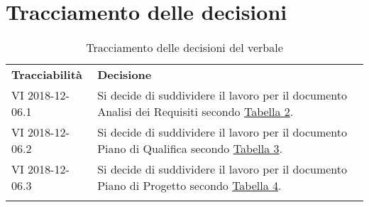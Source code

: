 \clearpage
\section{Tracciamento delle decisioni}
\begin{center}
	\renewcommand{\arraystretch}{1.5}
	\begin{longtable}{  p{2.8cm} p{11.4cm} }
		\rowcolor{tableHeadYellow}
		\textbf{Tracciabilità}&\textbf{Decisione}\\
		VI 2018-12-06.1 & Si decide di suddividere il lavoro per il documento Analisi dei Requisiti secondo \hyperref[sec:tabella_riassuntiva1]{Tabella 2}.\\
		VI 2018-12-06.2 & Si decide di suddividere il lavoro per il documento Piano di Qualifica secondo \hyperref[sec:tabella_riassuntiva2]{Tabella 3}.\\
		VI 2018-12-06.3 & Si decide di suddividere il lavoro per il documento Piano di Progetto secondo \hyperref[sec:tabella_riassuntiva3]{Tabella 4}.\\
		\rowcolor{white}
		\caption{Tracciamento delle decisioni del verbale}
	\end{longtable}	
\end{center}